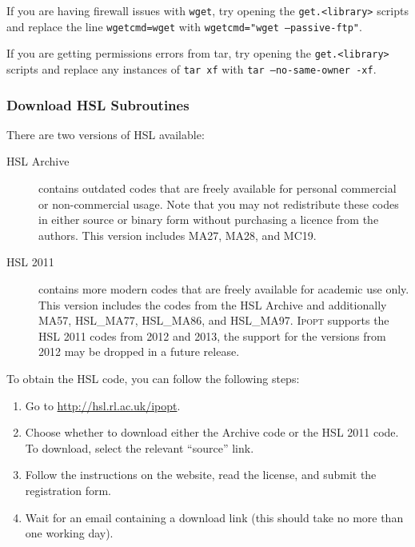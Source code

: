 \documentclass[10pt]{article}
\newcommand{\Ipopt}{\textsc{Ipopt}\xspace}
\begin{document}
If you are having firewall issues with {\tt wget}, try opening the {\tt get.<library>} scripts and replace the line {\tt wgetcmd=wget} with {\tt wgetcmd="wget --passive-ftp"}.

If you are getting permissions errors from tar, try opening the {\tt get.<library>} scripts and replace any instances of {\tt tar xf} with {\tt tar --no-same-owner -xf}.

\subsubsection{Download HSL Subroutines}
\label{sec:HSL}

\noindent
There are two versions of HSL available:
\begin{description}
\item[HSL Archive] contains outdated codes that are freely available for
personal commercial or non-com\-mer\-cial usage. Note that you may not
redistribute these codes in either source or binary form without purchasing a
licence from the authors. This version includes MA27, MA28, and MC19.
\item[HSL 2011] contains more modern codes that are freely available for
academic use only. This version includes the codes from the HSL Archive and 
additionally MA57, HSL\_MA77, HSL\_MA86, and HSL\_MA97. \Ipopt supports the
HSL 2011 codes from 2012 and 2013, the support for the versions from 2012 may be
dropped in a future release.
\end{description}

To obtain the HSL code, you can follow the following steps:
\begin{enumerate}
\item Go to \url{http://hsl.rl.ac.uk/ipopt}.
\item Choose whether to download either the Archive code or the HSL 2011
   code. To download, select the relevant
   ``source'' link.
\item Follow the instructions on the website, read the license, and
   submit the registration form.
\item Wait for an email containing a download link (this should take no
   more than one working day).
\end{enumerate}
\end{document}
